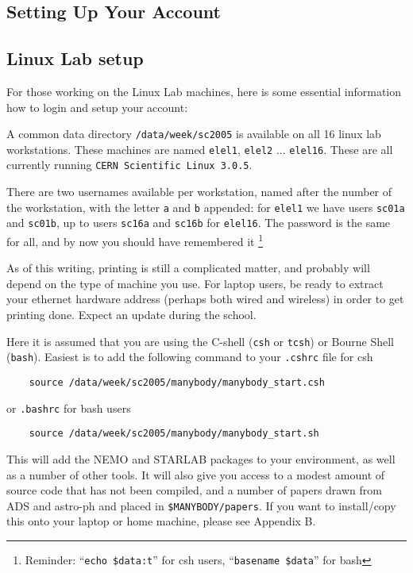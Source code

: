 \begin{itemize}
\begin{itemize}
\chapter                {Setting Up Your Account}

\section{Linux Lab setup}

For those working on the Linux Lab machines, here is some essential 
information how to login and setup your account:

A common data directory {\tt /data/week/sc2005} is available on all 16
linux lab workstations. These machines are 
named {\tt elel1}, {\tt elel2} ... {\tt elel16}. 
These are all currently running {\tt CERN Scientific Linux 3.0.5}.

There are two usernames available per workstation, named after the number
of the workstation, with the letter {\tt a} and {\tt b} appended:
for {\tt elel1} we have users {\tt sc01a} and {\tt sc01b},
up to 
users {\tt sc16a} and {\tt sc16b} for {\tt elel16}. The password is
the same for all, and by now you should have remembered it
\footnote{Reminder: ``{\tt echo \$data:t}'' for csh users, ``{\tt basename \$data}''
for bash}

As of this writing, printing is still a complicated matter, and probably 
will depend on the type
of machine you use. For laptop users, be ready to extract your ethernet hardware
address (perhaps both wired and wireless) in order to get printing done.
Expect an update during the school.

Here it is assumed that you are using 
the C-shell ({\tt csh} or {\tt tcsh}) or Bourne Shell  ({\tt bash}).
Easiest is to add the following  command to your {\tt .cshrc} file
for csh

\begin{verbatim}
    source /data/week/sc2005/manybody/manybody_start.csh
\end{verbatim}
or {\tt .bashrc} for bash users
\begin{verbatim}
    source /data/week/sc2005/manybody/manybody_start.sh
\end{verbatim}

This will add the NEMO and STARLAB packages to your environment, as well as
a number of other tools. It will also give you access to
a modest amount of source code that has not been compiled, and a number
of papers drawn from ADS and astro-ph and placed in {\tt \$MANYBODY/papers}.
If you want to install/copy this onto your laptop or home machine, please
see Appendix B.


\end{itemize}
\end{itemize}
